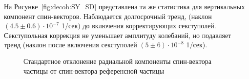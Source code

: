 На Рисунке~\ref{fig:decoh:SY_SD} представлена та же статистика  для вертикальных компонент спин-векторов. Наблюдается долгосрочный тренд, 
(наклон $(4.5 \pm 0.6)\cdot 10^{-7}$ 1/сек) до включения корректирующих секступолей. Секступольная коррекция не уменьшает амплитуду колебаний, 
но подавляет тренд (наклон после включения секступолей $(5\pm 6)\cdot 10^{-8}$ 1/сек).

\begin{figure}[h!]
	\centering
	\caption{Стандартное отклонение радиальной компоненты спин-вектора частицы от спин-вектора референсной частицы\label{fig:decoh:SX_SD}}
\end{figure}

